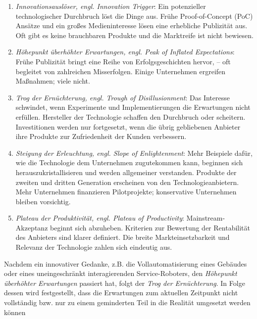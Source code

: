     \begin{enumerate}
        \item \textit{Innovationsauslöser, engl. Innovation Trigger}: Ein potenzieller technologischer Durchbruch 
        löst die Dinge aus. Frühe Proof-of-Concept (PoC) Ansätze und ein großes Medieninteresse lösen eine 
        erhebliche Publizität aus. Oft gibt es keine brauchbaren Produkte und die Marktreife ist nicht 
        bewiesen. \cite{gartner.2022m}
        \item \textit{Höhepunkt überhöhter Erwartungen, engl. Peak of Inflated Expectations}: Frühe Publizität 
        bringt eine Reihe von Erfolgsgeschichten hervor, – oft begleitet von zahlreichen Misserfolgen. 
        Einige Unternehmen ergreifen Maßnahmen; viele nicht. \cite{gartner.2022m}
        \item \textit{Trog der Ernüchterung, engl. Trough of Disillusionment}: Das Interesse schwindet, wenn 
        Experimente und Implementierungen die Erwartungen nicht erfüllen. Hersteller der Technologie schaffen den Durchbruch 
        oder scheitern. Investitionen werden nur fortgesetzt, wenn die übrig gebliebenen Anbieter ihre Produkte 
        zur Zufriedenheit der Kunden verbessern. \cite{gartner.2022m}
        \item \textit{Steigung der Erleuchtung, engl. Slope of Enlightenment}: Mehr Beispiele dafür, wie 
        die Technologie dem Unternehmen zugutekommen kann, beginnen sich herauszukristallisieren und 
        werden allgemeiner verstanden. Produkte der zweiten und dritten Generation erscheinen von den 
        Technologieanbietern. Mehr Unternehmen finanzieren Pilotprojekte; konservative Unternehmen 
        bleiben vorsichtig. \cite{gartner.2022m}
        \item \textit{Plateau der Produktivität, engl. Plateau of Productivity}: Mainstream-Akzeptanz beginnt 
        sich abzuheben. Kriterien zur Bewertung der Rentabilität des Anbieters sind klarer definiert. 
        Die breite Markteinsetzbarkeit und Relevanz der Technologie zahlen sich eindeutig aus. \cite{gartner.2022m}
    \end{enumerate}
    Nachdem ein innovativer Gedanke, z.B. die 
    Vollautomatisierung eines Gebäudes 
    oder eines uneingeschränkt interagierenden Service-Roboters, den \textit{Höhepunkt überhöhter Erwartungen} passiert hat, 
    folgt der \textit{Trog der Ernüchterung}. In Folge dessen wird festgestellt, dass die Erwartungen zum aktuellen Zeitpunkt nicht 
    vollständig bzw. nur zu einem geminderten Teil in die Realität umgesetzt werden können 
